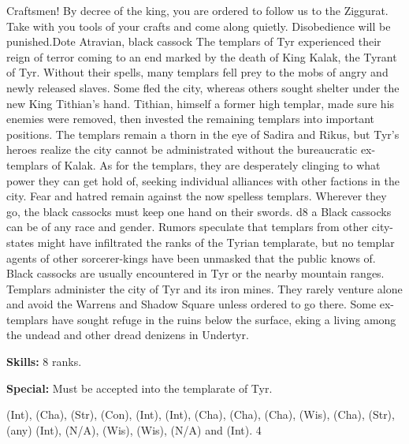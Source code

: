 {Craftsmen! By decree of the king, you are ordered to follow us to the Ziggurat. Take with you tools of your crafts and come along quietly. Disobedience will be punished.}{Dote Atravian, black cassock}
{The templars of Tyr experienced their reign of terror coming to an end marked by the death of King Kalak, the Tyrant of Tyr. Without their spells, many templars fell prey to the mobs of angry and newly released slaves. Some fled the city, whereas others sought shelter under the new King Tithian’s hand. Tithian, himself a former high templar, made sure his enemies were removed, then invested the remaining templars into important positions. The templars remain a thorn in the eye of Sadira and Rikus, but Tyr’s heroes realize the city cannot be administrated without the bureaucratic ex-templars of Kalak. As for the templars, they are desperately clinging to what power they can get hold of, seeking individual alliances with other factions in the city. Fear and hatred remain against the now spelless templars. Wherever they go, the black cassocks must keep one hand on their swords.}
{d8}
{a}
{Black cassocks can be of any race and gender. Rumors speculate that templars from other city-states might have infiltrated the ranks of the Tyrian templarate, but no templar agents of other sorcerer-kings have been unmasked that the public knows of. Black cassocks are usually encountered in Tyr or the nearby mountain ranges. Templars administer the city of Tyr and its iron mines. They rarely venture alone and avoid the Warrens and Shadow Square unless ordered to go there. Some ex-templars have sought refuge in the ruins below the surface, eking a living among the undead and other dread denizens in Undertyr.}
{
\textbf{Skills:}  8 ranks.

\textbf{Special:} Must be accepted into the templarate of Tyr.
}
{ (Int),  (Cha),  (Str),  (Con),  (Int),  (Int),  (Cha),  (Cha),  (Cha),  (Wis),  (Cha),  (Str),  (any) (Int),  (N/A),  (Wis),  (Wis),  (N/A) and  (Int).}
{4}
